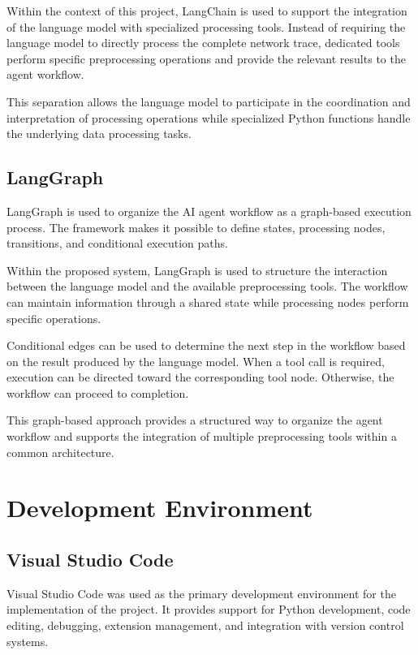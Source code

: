 Within the context of this project, LangChain is used to support the integration of the language model with specialized processing tools. Instead of requiring the language model to directly process the complete network trace, dedicated tools perform specific preprocessing operations and provide the relevant results to the agent workflow.

This separation allows the language model to participate in the coordination and interpretation of processing operations while specialized Python functions handle the underlying data processing tasks.

\subsection{LangGraph}

LangGraph is used to organize the AI agent workflow as a graph-based execution process. The framework makes it possible to define states, processing nodes, transitions, and conditional execution paths.

Within the proposed system, LangGraph is used to structure the interaction between the language model and the available preprocessing tools. The workflow can maintain information through a shared state while processing nodes perform specific operations.

Conditional edges can be used to determine the next step in the workflow based on the result produced by the language model. When a tool call is required, execution can be directed toward the corresponding tool node. Otherwise, the workflow can proceed to completion.

This graph-based approach provides a structured way to organize the agent workflow and supports the integration of multiple preprocessing tools within a common architecture.

\section{Development Environment}

\subsection{Visual Studio Code}

Visual Studio Code was used as the primary development environment for the implementation of the project. It provides support for Python development, code editing, debugging, extension management, and integration with version control systems.


